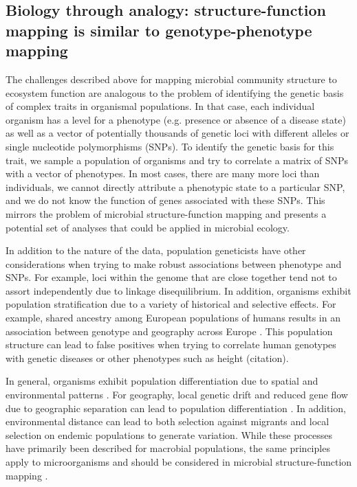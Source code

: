 \documentclass{article}
\begin{document}
\subsection{Biology through analogy: structure-function mapping is similar
to genotype-phenotype mapping}

The challenges described above for mapping microbial community structure to
ecosystem function are analogous to the problem of identifying the
genetic basis of complex traits in organismal populations. In that case,
each individual organism has a level for a phenotype (e.g. presence
or absence of a disease state) as well as a vector of potentially
thousands of genetic loci with different alleles or single nucleotide
polymorphisms (SNPs). To identify the genetic basis for this trait, we sample
a population of organisms and try to correlate a matrix of SNPs with a
vector of phenotypes. In most cases, there are many more loci than
individuals, we cannot directly attribute a phenotypic state to a particular
SNP, and we do not know the function of genes associated with these
SNPs. This mirrors the problem of microbial structure-function mapping
and presents a potential set of analyses that could be applied in
microbial ecology.

In addition to the nature of the data, population geneticists have other
considerations when trying to make robust associations between phenotype
and SNPs. For example, loci within the genome that are close together tend
not to assort independently due to linkage disequilibrium. In addition,
organisms exhibit population stratification due to a variety of historical
and selective effects. For example, shared ancestry among European
populations of humans results in an association between genotype and
geography across Europe \citep{novembre2008}. This population structure
can lead to false positives when trying to correlate human genotypes
with genetic diseases or other phenotypes such as height (citation).

In general, organisms exhibit population differentiation due to spatial
and environmental patterns \citep{wright1943}. For geography, local genetic
drift and reduced gene flow due to geographic separation can lead to population
differentiation \citep{wright1943}. In addition, environmental distance can lead to both selection
against migrants \citep{hendry2004} and local selection on endemic populations to
generate variation. While
these processes have primarily been described for macrobial populations, the
same principles apply to microorganisms and should be considered
in microbial structure-function mapping \citep{martiny2006}. 
\end{document}
